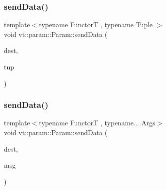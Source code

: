 \mbox{\label{structvt_1_1param_1_1_param_ad7524b5a6d2609de674fe4040d2fb90d}} 
\subsubsection{\texorpdfstring{send\+Data()}{sendData()}\hspace{0.1cm}{\footnotesize\ttfamily [5/7]}}
{\footnotesize\ttfamily template$<$typename FunctorT , typename Tuple $>$ \\
void vt\+::param\+::\+Param\+::send\+Data (\begin{DoxyParamCaption}\item[{\hyperlink{namespacevt_a866da9d0efc19c0a1ce79e9e492f47e2}{Node\+Type} const \&}]{dest,  }\item[{Tuple}]{tup }\end{DoxyParamCaption})\hspace{0.3cm}{\ttfamily [inline]}}

\mbox{\label{structvt_1_1param_1_1_param_aa2405fed990331c40b9f8e05e8649a26}} 
\subsubsection{\texorpdfstring{send\+Data()}{sendData()}\hspace{0.1cm}{\footnotesize\ttfamily [6/7]}}
{\footnotesize\ttfamily template$<$typename FunctorT , typename... Args$>$ \\
void vt\+::param\+::\+Param\+::send\+Data (\begin{DoxyParamCaption}\item[{\hyperlink{namespacevt_a866da9d0efc19c0a1ce79e9e492f47e2}{Node\+Type} const \&}]{dest,  }\item[{\hyperlink{namespacevt_ab2b3d506ec8e8d1540aede826d84a239}{Msg\+Shared\+Ptr}$<$ \hyperlink{structvt_1_1param_1_1_data_msg}{Data\+Msg}$<$ std\+::tuple$<$ Args... $>$$>$$>$}]{msg }\end{DoxyParamCaption})\hspace{0.3cm}{\ttfamily [inline]}}

\mbox{\label{structvt_1_1param_1_1_param_a706146de8f6eab423f7e5c7872587519}} 
